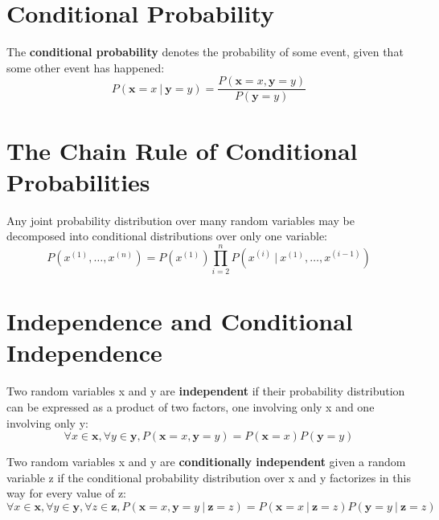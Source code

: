 \documentclass[12pt]{report}
\begin{document}
    \section{Conditional Probability}
        The \textbf{conditional probability} denotes the probability of some event, given that some other event has happened:
        \begin{equation}
            P(\mathbf{x} = x~|~\mathbf{y} = y) = \frac{P(\mathbf{x} = x, \mathbf{y} = y)}{P(\mathbf{y} = y)}
        \end{equation}

    \section{The Chain Rule of Conditional Probabilities}
        Any joint probability distribution over many random variables may be decomposed into conditional distributions over only one variable:
        \begin{equation}
            P\left(x^{(1)}, \dots, x^{(n)}\right) = P\left(x^{(1)}\right)\prod_{i = 2}^{n}{P\left(x^{(i)}~|~x^{(1)},\dots ,x^{(i - 1)}\right)}
        \end{equation}
        
    \section{Independence and Conditional Independence}
        Two random variables x and y are \textbf{independent} if their probability distribution can be expressed as a product of two factors, one involving only x and one involving only y:
        \begin{equation}
            \forall x \in \mathbf{x}, \forall y \in \mathbf{y}, P(\mathbf{x} = x, \mathbf{y} = y) = P(\mathbf{x} = x)P(\mathbf{y} = y)
        \end{equation}
        
        Two random variables x and y are \textbf{conditionally independent} given a random variable z if the conditional probability distribution over x and y factorizes in this way for every value of z:
        \begin{equation}
            \forall x \in \mathbf{x}, \forall y \in \mathbf{y}, \forall z \in \mathbf{z},  P(\mathbf{x} = x, \mathbf{y} = y~|~\mathbf{z} = z) = P(\mathbf{x} = x~|~\mathbf{z} = z)P(\mathbf{y} = y~|~\mathbf{z} = z)
        \end{equation}
        
\end{document}

